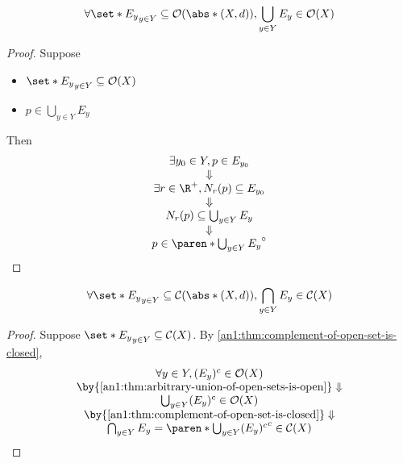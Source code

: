 \begin{theorem} \label{an1:thm:arbitrary-union-of-open-sets-is-open}
  \[
    \forall \set*{E_{y}}_{y \in Y} \subseteq \mathcal{O}(\abs*{(X, d)}), \bigcup_{y \in Y} E_{y} \in \mathcal{O}(X)
  \]
\end{theorem}

\begin{proof}
  Suppose
  \begin{itemize}
    \item $\set*{E_{y}}_{y \in Y} \subseteq \mathcal{O}(X)$
    \item $p \in \bigcup_{y \in Y} E_{y}$
  \end{itemize}
  Then
  \[
    \begin{array}{c}
      \exists y_{0} \in Y, p \in E_{y_{0}}               \\
      \Downarrow                                         \\
      \exists r \in \R^{+}, N_{r}(p) \subseteq E_{y_{0}} \\
      \Downarrow                                         \\
      N_{r}(p) \subseteq \bigcup_{y \in Y} E_{y}         \\
      \Downarrow                                         \\
      p \in \paren*{\bigcup_{y \in Y} E_{y}}^{\circ}
    \end{array}
  \]
\end{proof}

\begin{corollary} \label{an1:cor:arbitrary-intersection-of-closed-sets-is-closed}
  \[
    \forall \set*{E_{y}}_{y \in Y} \subseteq \mathcal{C}(\abs*{(X, d)}), \bigcap_{y \in Y} E_{y} \in \mathcal{C}(X)
  \]
\end{corollary}

\begin{proof}
  Suppose $\set*{E_{y}}_{y \in Y} \subseteq \mathcal{C}(X)$. By \cref{an1:thm:complement-of-open-set-is-closed},
  \[
    \begin{array}{c}
      \forall y \in Y, (E_{y})^{c} \in \mathcal{O}(X)                     \\
      \by{\Cref{an1:thm:arbitrary-union-of-open-sets-is-open}} \Downarrow \\
      \bigcup_{y \in Y} (E_{y})^{c} \in \mathcal{O}(X)                    \\
      \by{\Cref{an1:thm:complement-of-open-set-is-closed}} \Downarrow     \\
      \bigcap_{y \in Y} E_{y} = \paren*{\bigcup_{y \in Y} (E_{y})^{c}}^{c} \in \mathcal{C}(X)
    \end{array}
  \]
\end{proof}

